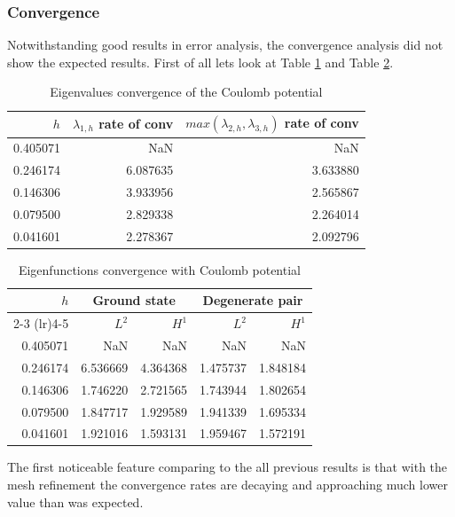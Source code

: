 \documentclass[conference]{IEEEtran}
\begin{document}
\subsubsection{Convergence}
Notwithstanding good results in error analysis, the convergence analysis did not show the expected results. First of all lets look at Table \ref{tab:coulomb eigval conv} and Table \ref{tab:coulomb eigfunc conv}.
\begin{table}[H]
    \centering
    \caption{Eigenvalues convergence of the Coulomb potential}
    \label{tab:coulomb eigval conv}
    \begin{tabular}{rrr}
        \toprule
        $h$ & $\lambda_{1,h}$ rate of conv & $max(\lambda_{2,h}, \lambda_{3,h})$ rate of conv \\
        \midrule
        0.405071 & NaN & NaN \\
        0.246174 & 6.087635 & 3.633880 \\
        0.146306 & 3.933956 & 2.565867 \\
        0.079500 & 2.829338 & 2.264014 \\
        0.041601 & 2.278367 & 2.092796 \\
        \bottomrule
    \end{tabular}
\end{table}

\begin{table}[H]
    \centering
    \caption{Eigenfunctions convergence with Coulomb potential}
    \label{tab:coulomb eigfunc conv}
    \begin{tabular}{rrrrr}
        \toprule
        $h$ & \multicolumn{2}{c}{Ground state} & \multicolumn{2}{c}{Degenerate pair} \\
        \cmidrule(lr){2-3}
        \cmidrule(lr){4-5}
        & $L^2$ & $H^1$ & $L^2$ & $H^1$ \\
        \midrule
        0.405071 & NaN & NaN & NaN & NaN \\
        0.246174 & 6.536669 & 4.364368 & 1.475737 & 1.848184 \\
        0.146306 & 1.746220 & 2.721565 & 1.743944 & 1.802654 \\
        0.079500 & 1.847717 & 1.929589 & 1.941339 & 1.695334 \\
        0.041601 & 1.921016 & 1.593131 & 1.959467 & 1.572191 \\
        \bottomrule
    \end{tabular}
\end{table}

The first noticeable feature comparing to the all previous results is that with the mesh refinement the convergence rates are decaying and approaching much lower value than was expected. 
\end{document}
